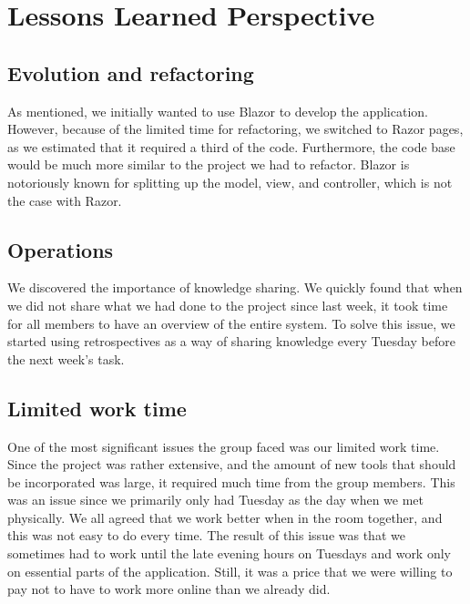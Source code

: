 \newpage
\section{Lessons Learned Perspective}






\subsection{Evolution and refactoring} \label{evoref}
As mentioned, we initially wanted to use Blazor to develop the application. However, because of the limited time for refactoring, we switched to Razor pages, as we estimated that it required a third of the code. Furthermore, the code base would be much more similar to the project we had to refactor. Blazor is notoriously known for splitting up the model, view, and controller, which is not the case with Razor.

\subsection{Operations}
We discovered the importance of knowledge sharing. We quickly found that when we did not share what we had done to the project since last week, it took time for all members to have an overview of the entire system. To solve this issue, we started using retrospectives as a way of sharing knowledge every Tuesday before the next week's task.

\subsection{Limited work time}
One of the most significant issues the group faced was our limited work time. Since the project was rather extensive, and the amount of new tools that should be incorporated was large, it required much time from the group members. This was an issue since we primarily only had Tuesday as the day when we met physically. We all agreed that we work better when in the room together, and this was not easy to do every time. The result of this issue was that we sometimes had to work until the late evening hours on Tuesdays and work only on essential parts of the application. Still, it was a price that we were willing to pay not to have to work more online than we already did.

